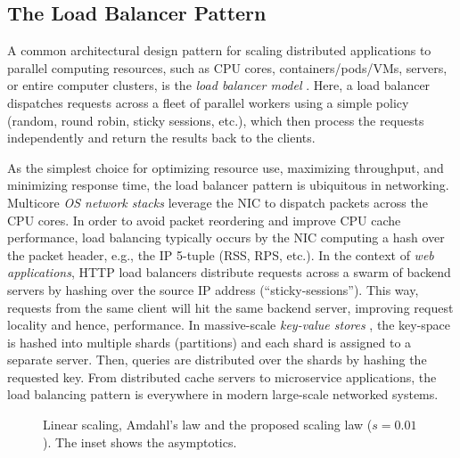 \documentclass[letterpaper,twocolumn,10pt]{article}
\begin{document}
\subsection{The Load Balancer Pattern}
\label{sec:lb-pattern}

A common architectural design pattern for scaling distributed applications to parallel computing resources, such as CPU cores, containers\slash pods\slash VMs, servers, or entire computer clusters, is the \emph{load balancer model} \cite{10.5555/3235491}.  Here, a load balancer dispatches requests across a fleet of parallel workers using a simple policy (random, round robin, sticky sessions, etc.), which then process the requests independently and return the results back to the clients.

As the simplest choice for optimizing resource use, maximizing throughput, and minimizing response time, the load balancer pattern is ubiquitous in networking. Multicore \emph{OS network stacks} \cite{211263, 10.1145/3359989.3365412, 10.1145/3452296.3472914} leverage the NIC to dispatch packets across the CPU cores. In order to avoid packet reordering and improve CPU cache performance, load balancing typically occurs by the NIC computing a hash over the packet header, e.g., the IP 5-tuple (RSS, RPS, etc.).  In the context of \emph{web applications}, HTTP load balancers \cite{194966, 211279, 9552525} distribute requests across a swarm of backend servers by hashing over the source IP address (``sticky-sessions''). This way, requests from the same client will hit the same backend server, improving request locality and hence, performance. In massive-scale \emph{key-value stores} \cite{ghigoff2021bmc}, the key-space is hashed into multiple shards (partitions) and each shard is assigned to a separate server. Then, queries are distributed over the shards by hashing the requested key. From distributed cache servers to microservice applications, the load balancing pattern is everywhere in modern large-scale networked systems.

\begin{figure}[t]
  \centering
  \begin{small}
  
\end{small}
  \caption{Linear scaling, Amdahl's law and the proposed scaling law ($s=0.01$). The inset shows the asymptotics.}
  \label{fig:amdahl}
\end{figure}
\end{document}
